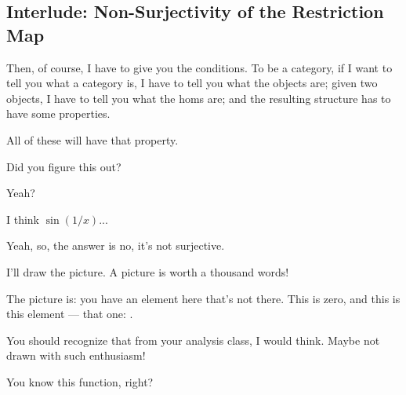 \subsection{Interlude: Non-Surjectivity of the Restriction Map}

\begin{speech}[01:10:24 - 01:10:54]
Then, of course, I have to give you the conditions. To be a category, if I want to tell you what a category is, I have to tell you what the objects are; given two objects, I have to tell you what the homs are; and the resulting structure has to have some properties.

All of these will have that property.
\end{speech}

\begin{speech}[01:10:54 - 01:11:01]
 Did you figure this out?

Yeah?
\end{speech}

\begin{student}
I think $\sin(1/x)$...
\end{student}

\begin{speech}[01:11:01 - 01:11:29]
Yeah, so, the answer is no, it's not surjective.

I'll draw the picture. A picture is worth a thousand words!

The picture is: you have an element here that's not there. This is zero, and this is this element --- that one: .

You should recognize that from your analysis class, I would think. Maybe not drawn with such enthusiasm!

You know this function, right?
\end{speech}

